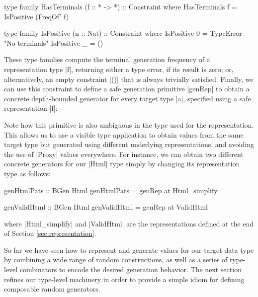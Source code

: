 \begin{code}
type family HasTerminals (f :: * -> *) :: Constraint where
  HasTerminals f = IsPositive (FreqOf' f)

type family IsPositive (n :: Nat) :: Constraint where
  IsPositive 0 = TypeError "No terminals"
  IsPositive _ = ()
\end{code}
%
These type families compute the terminal generation frequency of a
representation type |f|, returning either a type error, if its result is zero;
or, alternatively, an empty constraint |()| that is always trivially satisfied.
%
Finally, we can use this constraint to define a safe generation primitive
|genRep| to obtain a concrete depth-bounded generator for every target type |a|,
specified using a safe representation |f|:

%
Note how this primitive is also ambiguous in the type used for the
representation.
%
This allows us to use a visible type application to obtain values from the same
target type but generated using different underlying representations, and
avoiding the use of |Proxy| values everywhere.
%
For instance, we can obtain two different concrete generators for our |Html|
type simply by changing its representation type as follows:

\begin{code}
genHtmlPats :: BGen Html
genHtmlPats = genRep at Html_simplify

genValidHtml :: BGen Html
genValidHtml = genRep  at ValidHtml
\end{code}
%
where |Html_simplify| and |ValidHtml| are the representations defined at the end
of Section \ref{sec:representation}.


%
So far we have seen how to represent and generate values for our target data
type by combining a wide range of random constructions, as well as a series of
type-level combinators to encode the desired generation behavior.
%
The next section refines our type-level machinery in order to provide a simple
idiom for defining composable random generators.
